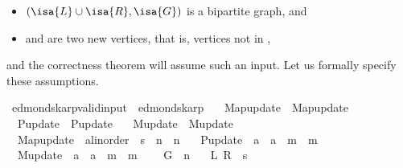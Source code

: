 \begin{isabellebody}
\begin{isamarkuptext}
%
\begin{itemize}%
\item $(\isa{L}\cup \isa{R},\isa{G})$ is a bipartite graph, and

\item {} and  are two new vertices, that is, vertices not in ,%
\end{itemize}


and the correctness theorem will assume such an input. Let us formally specify these assumptions.%
\end{isamarkuptext}\isamarkuptrue%
\isamarkupfalse%
\ edmonds{\isacharunderscore}{\kern0pt}karp{\isacharunderscore}{\kern0pt}valid{\isacharunderscore}{\kern0pt}input\ {\isacharequal}{\kern0pt}\ edmonds{\isacharunderscore}{\kern0pt}karp\ \isanewline
\ \ Map{\isacharunderscore}{\kern0pt}update\ {\isacharequal}{\kern0pt}\ Map{\isacharunderscore}{\kern0pt}update\ \isanewline
\ \ P{\isacharunderscore}{\kern0pt}update\ {\isacharequal}{\kern0pt}\ P{\isacharunderscore}{\kern0pt}update\ \isanewline
\ \ M{\isacharunderscore}{\kern0pt}update\ {\isacharequal}{\kern0pt}\ M{\isacharunderscore}{\kern0pt}update\ \isanewline
\ \ Map{\isacharunderscore}{\kern0pt}update\ {\isacharcolon}{\kern0pt}{\isacharcolon}{\kern0pt}\ {\isachardoublequoteopen}{\isacharprime}{\kern0pt}a{\isacharcolon}{\kern0pt}{\isacharcolon}{\kern0pt}linorder\ {\isasymRightarrow}\ {\isacharprime}{\kern0pt}s\ {\isasymRightarrow}\ {\isacharprime}{\kern0pt}n\ {\isasymRightarrow}\ {\isacharprime}{\kern0pt}n{\isachardoublequoteclose}\ \isanewline
\ \ P{\isacharunderscore}{\kern0pt}update\ {\isacharcolon}{\kern0pt}{\isacharcolon}{\kern0pt}\ {\isachardoublequoteopen}{\isacharprime}{\kern0pt}a\ {\isasymRightarrow}\ {\isacharprime}{\kern0pt}a\ {\isasymRightarrow}\ {\isacharprime}{\kern0pt}m\ {\isasymRightarrow}\ {\isacharprime}{\kern0pt}m{\isachardoublequoteclose}\ \isanewline
\ \ M{\isacharunderscore}{\kern0pt}update\ {\isacharcolon}{\kern0pt}{\isacharcolon}{\kern0pt}\ {\isachardoublequoteopen}{\isacharprime}{\kern0pt}a\ {\isasymRightarrow}\ {\isacharprime}{\kern0pt}a\ {\isasymRightarrow}\ {\isacharprime}{\kern0pt}m\ {\isasymRightarrow}\ {\isacharprime}{\kern0pt}m{\isachardoublequoteclose}\ {\isacharplus}{\kern0pt}\isanewline
\ \ \ G\ {\isacharcolon}{\kern0pt}{\isacharcolon}{\kern0pt}\ {\isacharprime}{\kern0pt}n\isanewline
\ \ \ L\ R\ {\isacharcolon}{\kern0pt}{\isacharcolon}{\kern0pt}\ {\isacharprime}{\kern0pt}s\isanewline

\end{isabellebody}
